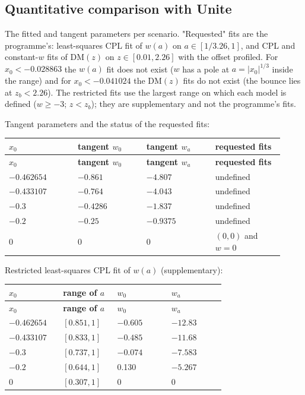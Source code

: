 \documentclass[11pt]{article}
\begin{document}
\subsection{Quantitative comparison with Unite}

The fitted and tangent parameters per scenario. "Requested" fits are the programme's: least-squares CPL fit of $w(a)$ on $a\in[1/3.26,1]$, and CPL and constant-$w$ fits of $\mathrm{DM}(z)$ on $z\in[0.01,2.26]$ with the offset profiled. For $x_0<-0.028863$ the $w(a)$ fit does not exist ($w$ has a pole at $a=|x_0|^{1/3}$ inside the range) and for $x_0<-0.041024$ the $\mathrm{DM}(z)$ fits do not exist (the bounce lies at $z_b<2.26$). The restricted fits use the largest range on which each model is defined ($w\ge-3$; $z<z_b$); they are supplementary and not the programme's fits.

Tangent parameters and the status of the requested fits:

\begin{longtable}{@{}p{0.230\linewidth}p{0.230\linewidth}p{0.230\linewidth}p{0.230\linewidth}@{}}
\toprule
\textbf{$x_0$} & \textbf{tangent $w_0$} & \textbf{tangent $w_a$} & \textbf{requested fits} \\
\midrule
\endfirsthead
\toprule
\textbf{$x_0$} & \textbf{tangent $w_0$} & \textbf{tangent $w_a$} & \textbf{requested fits} \\
\midrule
\endhead
$-0.462654$ & $-0.861$ & $-4.807$ & undefined \\
$-0.433107$ & $-0.764$ & $-4.043$ & undefined \\
$-0.3$ & $-0.4286$ & $-1.837$ & undefined \\
$-0.2$ & $-0.25$ & $-0.9375$ & undefined \\
0 & 0 & 0 & $(0,0)$ and $w=0$ \\
\bottomrule
\end{longtable}

Restricted least-squares CPL fit of $w(a)$ (supplementary):

\begin{longtable}{@{}p{0.230\linewidth}p{0.230\linewidth}p{0.230\linewidth}p{0.230\linewidth}@{}}
\toprule
\textbf{$x_0$} & \textbf{range of $a$} & \textbf{$w_0$} & \textbf{$w_a$} \\
\midrule
\endfirsthead
\toprule
\textbf{$x_0$} & \textbf{range of $a$} & \textbf{$w_0$} & \textbf{$w_a$} \\
\midrule
\endhead
$-0.462654$ & $[0.851,1]$ & $-0.605$ & $-12.83$ \\
$-0.433107$ & $[0.833,1]$ & $-0.485$ & $-11.68$ \\
$-0.3$ & $[0.737,1]$ & $-0.074$ & $-7.583$ \\
$-0.2$ & $[0.644,1]$ & 0.130 & $-5.267$ \\
0 & $[0.307,1]$ & 0 & 0 \\
\bottomrule
\end{longtable}
\end{document}
